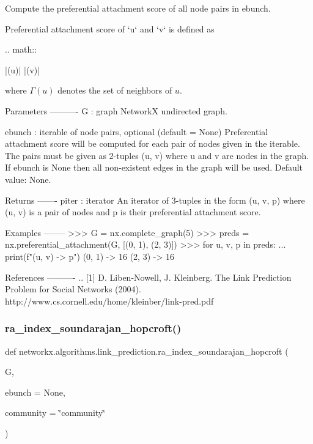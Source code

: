 \begin{DoxyVerb}Compute the preferential attachment score of all node pairs in ebunch.

Preferential attachment score of `u` and `v` is defined as

.. math::

    |\Gamma(u)| |\Gamma(v)|

where $\Gamma(u)$ denotes the set of neighbors of $u$.

Parameters
----------
G : graph
    NetworkX undirected graph.

ebunch : iterable of node pairs, optional (default = None)
    Preferential attachment score will be computed for each pair of
    nodes given in the iterable. The pairs must be given as
    2-tuples (u, v) where u and v are nodes in the graph. If ebunch
    is None then all non-existent edges in the graph will be used.
    Default value: None.

Returns
-------
piter : iterator
    An iterator of 3-tuples in the form (u, v, p) where (u, v) is a
    pair of nodes and p is their preferential attachment score.

Examples
--------
>>> G = nx.complete_graph(5)
>>> preds = nx.preferential_attachment(G, [(0, 1), (2, 3)])
>>> for u, v, p in preds:
...     print(f"({u}, {v}) -> {p}")
(0, 1) -> 16
(2, 3) -> 16

References
----------
.. [1] D. Liben-Nowell, J. Kleinberg.
       The Link Prediction Problem for Social Networks (2004).
       http://www.cs.cornell.edu/home/kleinber/link-pred.pdf
\end{DoxyVerb}
 \mbox{\label{namespacenetworkx_1_1algorithms_1_1link__prediction_aec305e0e0ad608c561c6e51b358b1fb3}} 
\subsubsection{\texorpdfstring{ra\+\_\+index\+\_\+soundarajan\+\_\+hopcroft()}{ra\_index\_soundarajan\_hopcroft()}}
{\footnotesize\ttfamily def networkx.\+algorithms.\+link\+\_\+prediction.\+ra\+\_\+index\+\_\+soundarajan\+\_\+hopcroft (\begin{DoxyParamCaption}\item[{}]{G,  }\item[{}]{ebunch = {\ttfamily None},  }\item[{}]{community = {\ttfamily \char`\"{}community\char`\"{}} }\end{DoxyParamCaption})}

